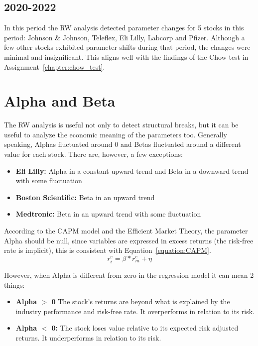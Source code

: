 \subsection{2020-2022}

In this period the RW analysis detected parameter changes for 5 stocks in this period: Johnson \& Johnson, Teleflex, Eli Lilly, 
Labcorp and Pfizer.
Although a few other stocks exhibited parameter shifts during that period, the changes were minimal and insignificant. 
This aligns well with the findings of the Chow test in Assignment~\ref{chapter:chow_test}.

\section{Alpha and Beta}

The RW analysis is useful not only to detect structural breaks, but it can be useful to analyze the economic meaning of the
parameters too.
Generally speaking, Alphas fluctuated around 0 and Betas fluctuated around a different value for each stock.
There are, however, a few exceptions:
\begin{itemize}
    \item \textbf{Eli Lilly:} Alpha in a constant upward trend and Beta in a downward trend with some fluctuation
    \item \textbf{Boston Scientific:} Beta in an upward trend
    \item \textbf{Medtronic:} Beta in an upward trend with some fluctuation
\end{itemize}

According to the CAPM model and the Efficient Market Theory, the parameter Alpha should be null, since variables are expressed
in excess returns (the risk-free rate is implicit), this is consistent with Equation~\ref{equation:CAPM}.
\begin{equation}
    r^{e}_{i} = \beta * r^{e}_{m} + \eta
\end{equation}\label{equation:CAPM}

However, when Alpha is different from zero in the regression model it can mean 2 things:
\begin{itemize}
    \item \textbf{Alpha $>$ 0} The stock's returns are beyond what is explained by the industry performance and risk-free rate. 
    It overperforms in relation to its risk.
    \item \textbf{Alpha $<$ 0:} The stock loses value relative to its expected risk adjusted returns. 
    It underperforms in relation to its risk.
\end{itemize}

